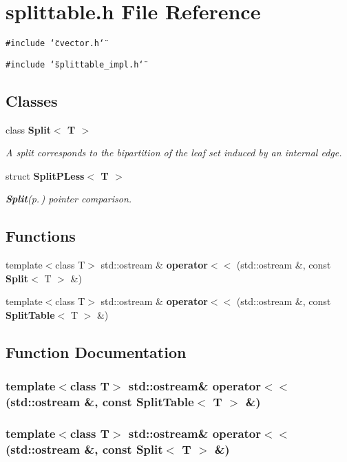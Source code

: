 \section{splittable.h File Reference}
\label{splittable_8h}
{\tt \#include \char`\"{}cvector.h\char`\"{}}\par
{\tt \#include \char`\"{}splittable\_\-impl.h\char`\"{}}\par
\subsection*{Classes}
\begin{CompactItemize}
\item 
class {\bf Split$<$ T $>$}
\begin{CompactList}\small\item\em A split corresponds to the bipartition of the leaf set induced by an internal edge. \item\end{CompactList}\item 
struct {\bf Split\-PLess$<$ T $>$}
\begin{CompactList}\small\item\em {\bf Split}{\rm (p.\,\pageref{classSplit})} pointer comparison. \item\end{CompactList}\end{CompactItemize}
\subsection*{Functions}
\begin{CompactItemize}
\item 
template$<$class T$>$ std::ostream \& {\bf operator$<$$<$} (std::ostream \&, const {\bf Split}$<$ T $>$ \&)
\item 
template$<$class T$>$ std::ostream \& {\bf operator$<$$<$} (std::ostream \&, const {\bf Split\-Table}$<$ T $>$ \&)
\end{CompactItemize}


\subsection{Function Documentation}
\subsubsection{\setlength{\rightskip}{0pt plus 5cm}template$<$class T$>$ std::ostream\& operator$<$$<$ (std::ostream \&, const {\bf Split\-Table}$<$ T $>$ \&)}\label{splittable_8h_a1}


\subsubsection{\setlength{\rightskip}{0pt plus 5cm}template$<$class T$>$ std::ostream\& operator$<$$<$ (std::ostream \&, const {\bf Split}$<$ T $>$ \&)}\label{splittable_8h_a0}



